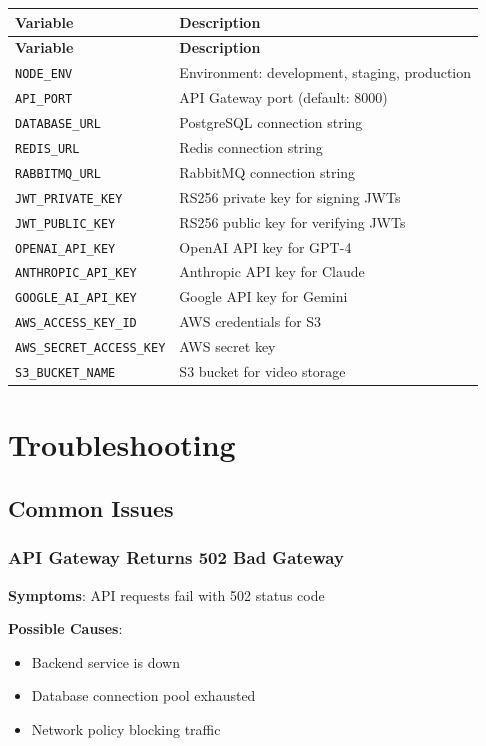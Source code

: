\documentclass[11pt,letterpaper]{article}
\begin{document}
\begin{longtable}{p{}p{}}
\toprule
\textbf{Variable} & \textbf{Description} \\
\midrule
\endfirsthead
\toprule
\textbf{Variable} & \textbf{Description} \\
\midrule
\endhead
\texttt{NODE\_ENV} & Environment: development, staging, production \\
\texttt{API\_PORT} & API Gateway port (default: 8000) \\
\texttt{DATABASE\_URL} & PostgreSQL connection string \\
\texttt{REDIS\_URL} & Redis connection string \\
\texttt{RABBITMQ\_URL} & RabbitMQ connection string \\
\texttt{JWT\_PRIVATE\_KEY} & RS256 private key for signing JWTs \\
\texttt{JWT\_PUBLIC\_KEY} & RS256 public key for verifying JWTs \\
\texttt{OPENAI\_API\_KEY} & OpenAI API key for GPT-4 \\
\texttt{ANTHROPIC\_API\_KEY} & Anthropic API key for Claude \\
\texttt{GOOGLE\_AI\_API\_KEY} & Google API key for Gemini \\
\texttt{AWS\_ACCESS\_KEY\_ID} & AWS credentials for S3 \\
\texttt{AWS\_SECRET\_ACCESS\_KEY} & AWS secret key \\
\texttt{S3\_BUCKET\_NAME} & S3 bucket for video storage \\
\bottomrule
\end{longtable}

\section{Troubleshooting}

\subsection{Common Issues}

\subsubsection{API Gateway Returns 502 Bad Gateway}

\textbf{Symptoms}: API requests fail with 502 status code

\textbf{Possible Causes}:
\begin{itemize}
    \item Backend service is down
    \item Database connection pool exhausted
    \item Network policy blocking traffic
\end{itemize}
\end{document}
